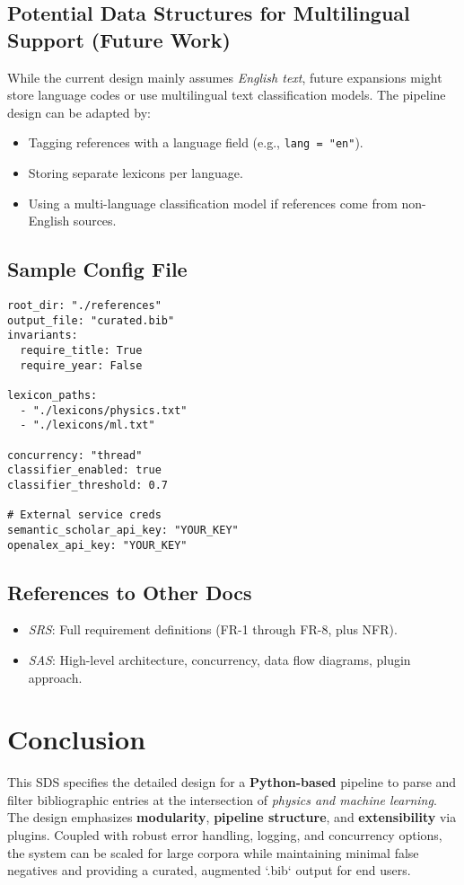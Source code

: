 \documentclass[12pt]{article}
\begin{document}
\subsection{Potential Data Structures for Multilingual Support (Future Work)}
While the current design mainly assumes \emph{English text}, future expansions might store language codes or use multilingual text classification models. The pipeline design can be adapted by:
\begin{itemize}
  \item Tagging references with a language field (e.g., \texttt{lang = "en"}).
  \item Storing separate lexicons per language.
  \item Using a multi-language classification model if references come from non-English sources.
\end{itemize}

\subsection{Sample Config File}
\begin{verbatim}
root_dir: "./references"
output_file: "curated.bib"
invariants:
  require_title: True
  require_year: False

lexicon_paths:
  - "./lexicons/physics.txt"
  - "./lexicons/ml.txt"

concurrency: "thread"
classifier_enabled: true
classifier_threshold: 0.7

# External service creds
semantic_scholar_api_key: "YOUR_KEY"
openalex_api_key: "YOUR_KEY"
\end{verbatim}

\subsection{References to Other Docs}
\begin{itemize}
  \item \emph{SRS}: Full requirement definitions (FR-1 through FR-8, plus NFR).
  \item \emph{SAS}: High-level architecture, concurrency, data flow diagrams, plugin approach.
\end{itemize}

\section*{Conclusion}
This SDS specifies the detailed design for a \textbf{Python-based} pipeline to parse and filter bibliographic entries at the intersection of \emph{physics and machine learning}. The design emphasizes \textbf{modularity}, \textbf{pipeline structure}, and \textbf{extensibility} via plugins. Coupled with robust error handling, logging, and concurrency options, the system can be scaled for large corpora while maintaining minimal false negatives and providing a curated, augmented `.bib` output for end users.
\end{document}

